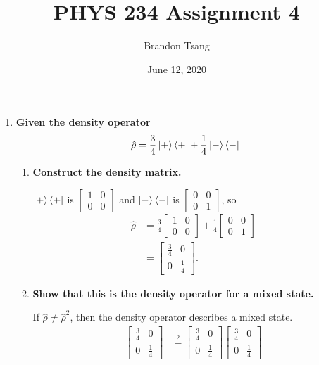 \documentclass[11pt]{article}
\title{PHYS 234 Assignment 4}
\author{Brandon Tsang}
\date{June 12, 2020}
\begin{document}
    \maketitle
    \begin{enumerate}[label=\textbf{\arabic*.}, start=2]
        \item{
            \textbf{\boldmath Given the density operator \[\hat{\rho}=\frac 3 4 \ket{+}\bra{+}+\frac 1 4 \ket{-}\bra{-}\]}
            \begin{enumerate}[label=\textbf{(\alph*)}]
                \item{
                    \textbf{Construct the density matrix.}
                    \par
                    \(\ket{+}\bra{+}\) is \(\begin{bmatrix}1 & 0 \\ 0 & 0\end{bmatrix}\) and \(\ket{-}\bra{-}\) is \(\begin{bmatrix}0 & 0 \\ 0 & 1\end{bmatrix}\), so
                    \begin{align*}
                        \hat\rho&=\frac 3 4 \begin{bmatrix}1 & 0 \\ 0 & 0\end{bmatrix}+\frac 1 4 \begin{bmatrix}0 & 0 \\ 0 & 1\end{bmatrix} \\
                        &=\begin{bmatrix}\frac 3 4 & 0 \\ 0 & \frac 1 4\end{bmatrix}.
                    \end{align*}
                }
                \item{
                    \textbf{Show that this is the density operator for a mixed state.}
                    \par
                    If \(\hat\rho\neq\hat\rho^2\), then the density operator describes a mixed state.
                    \begin{align*}
                        \begin{bmatrix}\frac 3 4 & 0 \\ 0 & \frac 1 4\end{bmatrix}&\stackrel{?}{=}\begin{bmatrix}\frac 3 4 & 0 \\ 0 & \frac 1 4\end{bmatrix}\begin{bmatrix}\frac 3 4 & 0 \\ 0 & \frac 1 4\end{bmatrix} \\

\end{align*}}
\end{enumerate}}
\end{enumerate}
\end{document}
